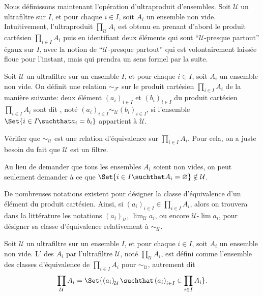 Nous définissons maintenant l'opération d'ultraproduit d'ensembles. Soit $\mathcal{U}$ un ultrafiltre sur $I$, et pour chaque $i\in I$, soit $A_{i}$ un ensemble non vide. Intuitivement, l'ultraproduit $\prod_{\mathcal{U}}A_{i}$ est obtenu en prenant d'abord le produit cartésien $\prod_{i\in I}A_{i}$ puis en identifiant deux éléments qui sont ``$\mathcal{U}$-presque partout'' égaux sur $I$, avec la notion de ``$\mathcal{U}$-presque partout'' qui est volontairement laissée floue pour l'instant, mais qui prendra un sens formel par la suite.

\begin{definition}
	Soit $\mathcal{U}$ un ultrafiltre sur un ensemble $I$, et pour chaque $i\in I$, soit $A_{i}$ un ensemble non vide. On définit une relation $\sim_{\mathcal{F}}$ sur le produit cartésien $\prod_{i\in I}A_{i}$ de la manière suivante: deux élément $\left(a_{i}\right)_{i\in I}$ et $\left(b_{i}\right)_{i\in I}$ du produit cartésien $\prod_{i\in I}A_{i}$ sont dit , noté $\left(a_{i}\right)_{i\in I}\sim_{\mathcal{U}}\left(b_{i}\right)_{i\in I}$, si l'ensemble $\Set{i\in I\suchthat a_{i}=b_{i}}$ appartient à $\mathcal{U}$.
\end{definition}

\begin{exercise}
	Vérifier que $\sim_{\mathcal{U}}$ est une relation d'équivalence sur $\prod_{i\in I}A_{i}$. Pour cela, on a juste besoin du fait que $\mathcal{U}$ est un filtre.
\end{exercise}

\begin{remark}
	Au lieu de demander que tous les ensembles $A_{i}$ soient non vides, on peut seulement demander à ce que $\Set{i\in I\suchthat A_{i}=\varnothing}\notin\mathcal{U}$.
\end{remark}

De nombreuses notations existent pour désigner la classe d'équivalence d'un élément du produit cartésien. Ainsi, si $\left(a_{i}\right)_{i\in I}\in\prod_{i\in I}A_{i}$, alors on trouvera dans la littérature les notations $\left(a_{i}\right)_{\mathcal{U}}$, $\lim_{\mathcal{U}}a_{i}$, ou encore $\mathcal{U}\text{-}\lim a_{i}$, pour désigner sa classe d'équivalence relativement à $\sim_{\mathcal{U}}$.

\begin{definition}
	Soit $\mathcal{U}$ un ultrafiltre sur un ensemble $I$, et pour chaque $i\in I$, soit $A_{i}$ un ensemble non vide. L' des $A_{i}$ par l'ultrafiltre $\mathcal{U}$, noté $\prod_{\mathcal{U}}A_{i}$, est défini comme l'ensemble des classes d'équivalence de $\prod_{i\in I}A_{i}$ pour $\sim_{\mathcal{U}}$, autrement dit
	\[
		\prod_{\mathcal{U}}A_{i}=\Set{\left(a_{i}\right)_{\mathcal{U}}\suchthat \left(a_{i}\right)_{i\in I}\in\prod_{i\in I}A_{i}}.
	\]
\end{definition}


